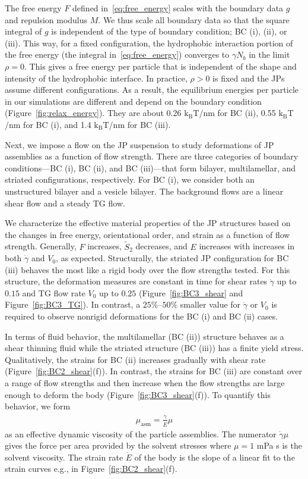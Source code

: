 \documentclass[prb,preprint,showpacs,preprintnumbers,amsmath,amssymb,longbibliography]{revtex4-1}
\begin{document}
The free energy $F$ defined in~\eqref{eq:free_energy} scales with the
boundary data $g$ and repulsion modulus $M$. 
We thus scale all boundary data so that the
square integral of $g$ is independent of the type of boundary condition; BC
(i), (ii), or (iii). This way, for a fixed configuration, the
hydrophobic interaction portion of the free energy (the integral
in~\eqref{eq:free_energy}) converges to $\gamma N_b$ in the limit
$\rho = 0$. This gives a free energy per particle that is independent of
the shape and intensity of the hydrophobic interface. In practice, $\rho
> 0$ is fixed and the JPs assume different configurations. As a result,
the equilibrium energies per particle in our simulations are different
and depend on the boundary condition (Figure~\ref{fig:relax_energy}).
They are about 0.26 $\mathrm{k_BT}$/nm for BC (ii), 0.55
$\mathrm{k_BT}$/nm for BC (i), and 1.4 $\mathrm{k_BT}$/nm for BC (iii).

Next, we impose a flow on the JP suspension to study
deformations of JP assemblies as a function of flow strength. There are three categories
of boundary conditions---BC (i), BC (ii), and BC (iii)---that form
bilayer, multilamellar, and striated configurations, respectively. For
BC (i), we consider both an unstructured bilayer and a vesicle
bilayer. The background flows are a linear shear flow and a steady TG flow.

We characterize the effective material properties of the JP
structures based on the changes in free energy, orientational order, and
strain as a function of flow strength. Generally, $F$ increases, $\tilde
S_2$ decreases, and $E$ increases with increases in both $\dot \gamma$
and $V_0$, as expected. Structurally, the striated JP configuration for
BC (iii) behaves the most like a rigid body over the flow strengths
tested. For this structure, the deformation measures are constant in
time for shear rates $\dot \gamma$ up to $0.15$ and TG flow rate $V_0$
up to $0.25$ (Figure~\ref{fig:BC3_shear} and Figure~\ref{fig:BC3_TG}).
In contrast, a $25\%$--$50 \%$ smaller value for $\dot \gamma$ or $V_0$ is
required to observe nonrigid deformations for the BC (i) and BC (ii)
cases.

In terms of fluid behavior, the multilamellar (BC (ii)) structure
behaves as a shear thinning fluid while the striated structure (BC (iii))
has a finite yield stress. Qualitatively, the strains for BC (ii)
increases gradually with shear rate (Figure~\ref{fig:BC2_shear}(f)). In
contrast, the strains for BC (iii) are constant over a range of flow
strengths and then increase when the flow strengths are large enough to
deform the body (Figure~\ref{fig:BC3_shear}(f)). To quantify this
behavior, we form 
\begin{align}
\label{eq:mu_asm}
\mu_{\text{asm}} = \frac{\dot \gamma}{\dot E} \mu 
\end{align}
as an effective dynamic viscosity of the particle assemblies. The
numerator $\dot \gamma \mu$ gives the force per area provided by the
solvent stresses where $\mu = 1$ mPa s is the solvent viscosity. The
strain rate $\dot E$ of the body is the slope of a linear fit to the
strain curves e.g., in Figure~\ref{fig:BC2_shear}(f).
\end{document}
